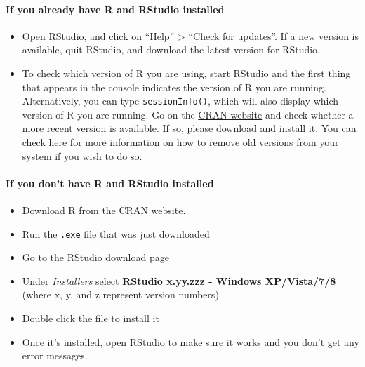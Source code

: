 \documentclass[
  12pt, krantz2,
]{krantz}
\newcommand{\passthrough}[1]{#1}
\providecommand{\tightlist}{%
  \setlength{\itemsep}{0pt}\setlength{\parskip}{0pt}}
\theoremstyle{definition}
\theoremstyle{definition}
\theoremstyle{definition}
\newcommand{\1}{\mathbbm{1}}
\begin{document}
\hypertarget{if-you-already-have-r-and-rstudio-installed}{%
\paragraph{If you already have R and RStudio installed}\label{if-you-already-have-r-and-rstudio-installed}}

\begin{itemize}
\tightlist
\item
  Open RStudio, and click on ``Help'' \textgreater{} ``Check for updates''. If a new version is
  available, quit RStudio, and download the latest version for RStudio.
\item
  To check which version of R you are using, start RStudio and the first thing
  that appears in the console indicates the version of R you are
  running. Alternatively, you can type \passthrough{\lstinline!sessionInfo()!}, which will also display
  which version of R you are running. Go on the \href{https://cran.r-project.org/bin/windows/base/}{CRAN
  website} and check whether a
  more recent version is available. If so, please download and install it. You
  can \href{https://cran.r-project.org/bin/windows/base/rw-FAQ.html\#How-do-I-UNinstall-R_003f}{check here}
  for more information on how to remove old versions from your system if you
  wish to do so.
\end{itemize}

\hypertarget{if-you-dont-have-r-and-rstudio-installed}{%
\paragraph{If you don't have R and RStudio installed}\label{if-you-dont-have-r-and-rstudio-installed}}

\begin{itemize}
\tightlist
\item
  Download R from
  the \href{http://cran.r-project.org/bin/windows/base/release.htm}{CRAN website}.
\item
  Run the \passthrough{\lstinline!.exe!} file that was just downloaded
\item
  Go to the \href{https://www.rstudio.com/products/rstudio/download/\#download}{RStudio download page}
\item
  Under \emph{Installers} select \textbf{RStudio x.yy.zzz - Windows
  XP/Vista/7/8} (where x, y, and z represent version numbers)
\item
  Double click the file to install it
\item
  Once it's installed, open RStudio to make sure it works and you don't get any
  error messages.
\end{itemize}
\end{document}
